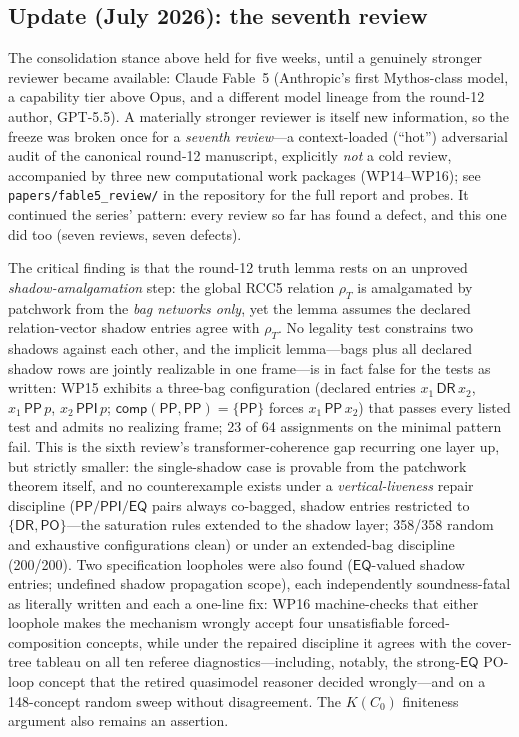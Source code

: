 \documentclass[
]{ceurart}
\theoremstyle{definition}
\newcommand{\DR}{\ensuremath{\mathsf{DR}}}
\newcommand{\PO}{\ensuremath{\mathsf{PO}}}
\newcommand{\EQ}{\ensuremath{\mathsf{EQ}}}
\newcommand{\PP}{\ensuremath{\mathsf{PP}}}
\newcommand{\PPI}{\ensuremath{\mathsf{PPI}}}
\newcommand{\comp}{\ensuremath{\mathsf{comp}}}
\begin{document}
\subsection{Update (July 2026): the seventh review}
\label{ssec:july2026-update}

The consolidation stance above held for five weeks, until a genuinely stronger
reviewer became available: Claude Fable~5 (Anthropic's first Mythos-class
model, a capability tier above Opus, and a different model lineage from the
round-12 author, GPT-5.5).  A materially stronger reviewer is itself new
information, so the freeze was broken once for a \emph{seventh review}---a
context-loaded (``hot'') adversarial audit of the canonical round-12
manuscript, explicitly \emph{not} a cold review, accompanied by three new
computational work packages (WP14--WP16); see
\texttt{papers/fable5\_review/} in the repository for the full report and
probes.  It continued the series' pattern: every review so far has found a
defect, and this one did too (seven reviews, seven defects).

The critical finding is that the round-12 truth lemma rests on an unproved
\emph{shadow-amalgamation} step: the global RCC5 relation $\rho_T$ is
amalgamated by patchwork from the \emph{bag networks only}, yet the lemma
assumes the declared relation-vector shadow entries agree with $\rho_T$.  No
legality test constrains two shadows against each other, and the implicit
lemma---bags plus all declared shadow rows are jointly realizable in one
frame---is in fact false for the tests as written: WP15 exhibits a three-bag
configuration (declared entries $x_1\,\DR\,x_2$, $x_1\,\PP\,p$,
$x_2\,\PPI\,p$; $\comp(\PP,\PP)=\{\PP\}$ forces $x_1\,\PP\,x_2$) that passes
every listed test and admits no realizing frame; 23 of 64 assignments on the
minimal pattern fail.  This is the sixth review's transformer-coherence gap
recurring one layer up, but strictly smaller: the single-shadow case is
provable from the patchwork theorem itself, and no counterexample exists
under a \emph{vertical-liveness} repair discipline ($\PP/\PPI/\EQ$ pairs
always co-bagged, shadow entries restricted to $\{\DR,\PO\}$---the
saturation rules extended to the shadow layer; 358/358 random and exhaustive
configurations clean) or under an extended-bag discipline (200/200).  Two
specification loopholes were also found ($\EQ$-valued shadow entries;
undefined shadow propagation scope), each independently soundness-fatal as
literally written and each a one-line fix: WP16 machine-checks that either
loophole makes the mechanism wrongly accept four unsatisfiable
forced-composition concepts, while under the repaired discipline it agrees
with the cover-tree tableau on all ten referee diagnostics---including,
notably, the strong-$\EQ$ PO-loop concept that the retired quasimodel
reasoner decided wrongly---and on a 148-concept random sweep without
disagreement.  The $K(C_0)$ finiteness argument also remains an assertion.
\end{document}
